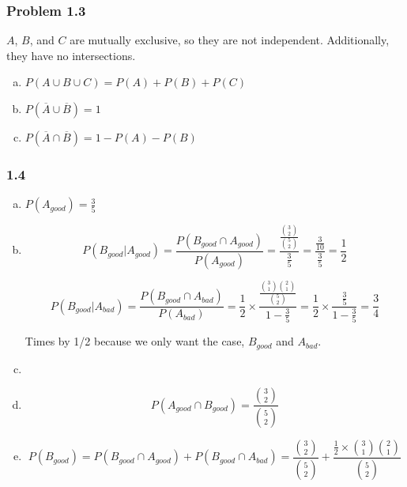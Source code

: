 \documentclass{article}
\begin{document}
\subsubsection*{Problem 1.3}

$A$, $B$, and $C$ are mutually exclusive, so they are not independent. Additionally, they have no intersections.


\begin{enumerate}[(a)]

\item $P(A \cup B \cup C) = P(A) + P(B) + P(C)$

\item $P(\overline{A} \cup \overline{B}) = 1$

\item $P(\overline{A} \cap \overline{B}) = 1 - P(A) - P(B)$ 


\end{enumerate}

\subsubsection*{1.4}

\begin{enumerate}[(a)]

\item $P(A_{good}) = \frac{3}{5}$

\item $$P(B_{good} | A_{good}) = \frac{P(B_{good} \cap A_{good})}{P(A_{good})} = \frac{\frac{{3 \choose 2}}{{5 \choose 2}}}{\frac{3}{5}} = \frac{\frac{3}{10}}{\frac{3}{5}} = \frac{1}{2}$$

$$P(B_{good} | A_{bad}) = \frac{P(B_{good} \cap A_{bad})}{P(A_{bad})} = \frac{1}{2} \times \frac{\frac{{3 \choose 1}{2 \choose 1}}{{5 \choose 2}}}{1 - \frac{3}{5}} = \frac{1}{2} \times \frac{\frac{3}{5}}{1 - \frac{3}{5}} = \frac{3}{4}$$

Times by 1/2 because we only want the case, $B_{good}$ and $A_{bad}$.

\item 

\item $$P(A_{good} \cap B_{good}) = \frac{{3 \choose 2}}{{5 \choose 2}}$$

\item $$P(B_{good}) = P(B_{good} \cap A_{good}) + P(B_{good} \cap A_{bad}) = \frac{{3 \choose 2}}{{5 \choose 2}} +  \frac{\frac{1}{2} \times {3 \choose 1}{2 \choose 1}}{{5 \choose 2}}$$

\end{enumerate}
\end{document}
